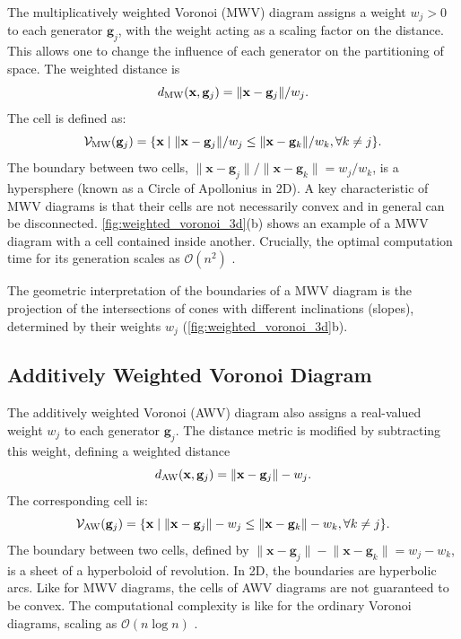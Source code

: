 \documentclass[fleqn,usenatbib]{mnras}
\newcommand{\norm}[1]{\lVert#1\rVert}
\begin{document}
The multiplicatively weighted Voronoi (MWV) diagram assigns a weight $w_j > 0$ to each generator $\mathbf{g}_j$, with the weight acting as a scaling factor on the distance. This allows one to change the influence of each generator on the partitioning of space. The weighted distance is 
\begin{equation}
d_{\rm MW}(\mathbf{x}, \mathbf{g}_j) = \norm{\mathbf{x} - \mathbf{g}_j} / w_j.
\end{equation}
The cell is defined as:
\begin{equation}
\mathcal{V}_{\rm MW}(\mathbf{g}_j)=\{\mathbf{x} \mid \norm{\mathbf{x} - \mathbf{g}_j}/w_j \leq \norm{\mathbf{x} - \mathbf{g}_k}/w_k, \forall k \neq j\}.
\end{equation}
The boundary between two cells, $\norm{\mathbf{x} - \mathbf{g}_j}/\norm{\mathbf{x} - \mathbf{g}_k} = w_j/w_k$, is a hypersphere (known as a Circle of Apollonius in 2D). A key characteristic of MWV diagrams is that their cells are not necessarily convex and in general can be disconnected. \autoref{fig:weighted_voronoi_3d}(b) shows an example of a MWV diagram with a cell contained inside another. Crucially, the optimal computation time for its generation scales as $\mathcal{O}(n^2)$ \citep[sec.~7.4.2]{Aurenhammer1984,Aurenhammer2013}.

The geometric interpretation of the boundaries of a MWV diagram is the projection of the intersections of cones with different inclinations (slopes), determined by their weights $w_j$ (\autoref{fig:weighted_voronoi_3d}b).

\subsection{Additively Weighted Voronoi Diagram}

The additively weighted Voronoi (AWV) diagram also assigns a real-valued weight $w_j$ to each generator $\mathbf{g}_j$. The distance metric is modified by subtracting this weight, defining a weighted distance 
\begin{equation}
    d_{\rm AW}(\mathbf{x}, \mathbf{g}_j) = \norm{\mathbf{x} - \mathbf{g}_j} - w_j.
\end{equation}
The corresponding cell is:
\begin{equation}
\mathcal{V}_{\rm AW}(\mathbf{g}_j)=\{\mathbf{x} \mid \norm{\mathbf{x} - \mathbf{g}_j} - w_j \leq \norm{\mathbf{x} - \mathbf{g}_k} - w_k, \forall k \neq j\}.
\end{equation}
The boundary between two cells, defined by $\norm{\mathbf{x} - \mathbf{g}_j} - \norm{\mathbf{x} - \mathbf{g}_k} = w_j - w_k$, is a sheet of a hyperboloid of revolution. In 2D, the boundaries are hyperbolic arcs. Like for MWV diagrams, the cells of AWV diagrams are not guaranteed to be convex. The computational complexity is like for the ordinary Voronoi diagrams, scaling as $\mathcal{O}(n \log n)$ \citep[sec.~7.4.1]{Fortune1986,Aurenhammer2013}.
\end{document}
